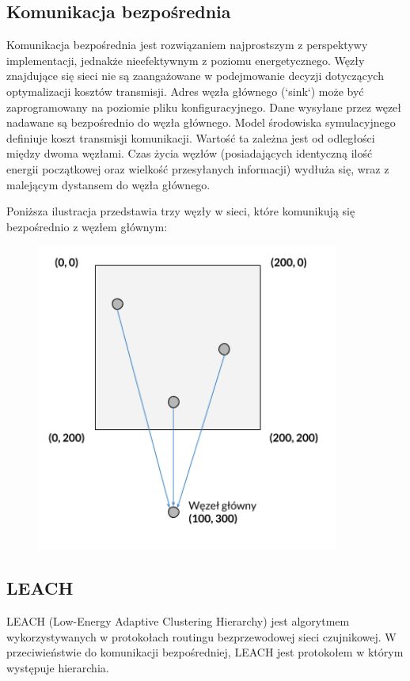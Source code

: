 \documentclass[a4paper,12pt,twoside,openany]{report}
\begin{document}
\subsection{Komunikacja bezpośrednia}

Komunikacja bezpośrednia jest rozwiązaniem najprostszym z perspektywy implementacji, jednakże nieefektywnym z poziomu energetycznego. 
Węzły znajdujące się sieci nie są zaangażowane w podejmowanie decyzji dotyczących optymalizacji kosztów transmisji. 
Adres węzła głównego (`sink`) może być zaprogramowany na poziomie pliku konfiguracyjnego.
Dane wysyłane przez węzeł nadawane są bezpośrednio do węzła głównego.
Model środowiska symulacyjnego definiuje koszt transmisji komunikacji. Wartość ta zależna jest od odległości między dwoma węzłami.
Czas życia węzłów (posiadających identyczną ilość energii początkowej oraz wielkość przesyłanych informacji) wydłuża się, wraz z malejącym dystansem do węzła głównego.

Poniższa ilustracja przedstawia trzy węzły w sieci, które komunikują się bezpośrednio z węzłem głównym:

\begin{figure}[H]
 \centering
 \includegraphics[width=10cm]{images/komunikacja_bezposrednia.png}
\end{figure}

\subsection{LEACH}

LEACH (Low-Energy Adaptive Clustering Hierarchy) jest algorytmem wykorzystywanych w protokołach routingu bezprzewodowej sieci czujnikowej.
W przeciwieństwie do komunikacji bezpośredniej, LEACH jest protokołem w którym występuje hierarchia. 
\end{document}
